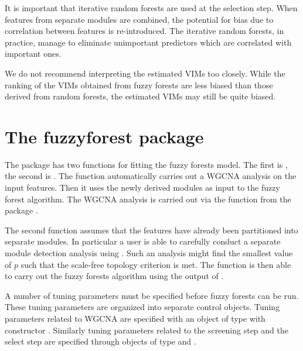 \documentclass[article,shortnames]{jss}
\begin{document}
It is important that iterative random forests are used at the selection step.  When features from separate modules are combined,
the potential for bias due to correlation between features is re-introduced.  The iterative random forests, in practice, manage to
eliminate unimportant predictors which are correlated with important ones.  

We do not recommend interpreting the estimated VIMs too closely.  While the ranking of the VIMs obtained from
fuzzy forests are less biased than those derived from random forests, the estimated VIMs may still be quite biased.

\section{The fuzzyforest package}
The package   has two functions for fitting the fuzzy forests model.  The first is , the
second is .  The function  automatically carries out a WGCNA analysis on the input features.
Then it uses the newly derived modules as input to the fuzzy forest algorithm.  The WGCNA analysis is carried out via the 
 function from the package .  

The second function  assumes that the features have already been partitioned into separate modules.
In particular a user is able to carefully conduct a separate module detection analysis using .  Such an 
analysis might find the smallest value of $p$ such that the scale-free topology criterion is met.  The function 
is then able to carry out the fuzzy forests algorithm using the output of .

A number of tuning parameters must be specified before fuzzy forests can be run.   These tuning parameters are organized
into separate control objects.  Tuning parameters related to WGCNA are specified with an  object of type 
with constructor \newline {}.
Similarly tuning parameters related to the screening step and the select step are specified through objects of type 
 and .  
\end{document}
